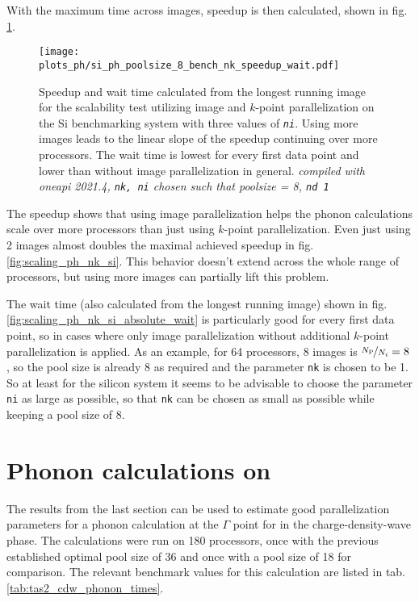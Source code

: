 \documentclass[main.tex]{subfiles}
\begin{document}
With the maximum time across images, speedup is then calculated, shown in fig. \ref{fig:scaling_ph_ni_poolsize_8_si}.

\begin{figure}[htb!]
    \centering
    \texttt{[image: plots\_ph/si\_ph\_poolsize\_8\_bench\_nk\_speedup\_wait.pdf]}
    \caption{Speedup and wait time calculated from the longest running image for the scalability test utilizing image and \(k\)-point parallelization on the Si benchmarking system with three values of \emph{\texttt{ni}}. Using more images leads to the linear slope of the speedup continuing over more processors. The wait time is lowest for every first data point and lower than without image parallelization in general. \emph{\QE compiled with \gls{oneapi} 2021.4, \texttt{nk, ni} chosen such that poolsize = 8, \texttt{nd 1}}}
    \label{fig:scaling_ph_ni_poolsize_8_si}
\end{figure}
The speedup shows that using image parallelization helps the phonon calculations scale over more processors than just using \(k\)-point parallelization.
Even just using 2 images almost doubles the maximal achieved speedup in fig. \ref{fig:scaling_ph_nk_si}.
This behavior doesn't extend across the whole range of processors, but using more images can partially lift this problem.

The wait time (also calculated from the longest running image) shown in fig. \ref{fig:scaling_ph_nk_si_absolute_wait} is particularly good for every first data point, so in cases where only image parallelization without additional \(k\)-point parallelization is applied.
As an example, for 64 processors, 8 images is \(\nicefrac{N_\mathrm{P}}{N_i} = 8\), so the pool size is already 8 as required and the parameter \texttt{nk} is chosen to be 1.
So at least for the silicon system it seems to be advisable to choose the parameter \texttt{ni} as large as possible, so that \texttt{nk} can be chosen as small as possible while keeping a pool size of 8.

\section{Phonon calculations on \TaS}\label{sec:phonon_tas2}

The results from the last section can be used to estimate good parallelization parameters for a phonon calculation at the \(\Gamma\) point for \TaS in the charge-density-wave phase.
The calculations were run on 180 processors, once with the previous established optimal pool size of 36 and once with a pool size of 18 for comparison.
The relevant benchmark values for this calculation are listed in tab. \ref{tab:tas2_cdw_phonon_times}.
\end{document}
